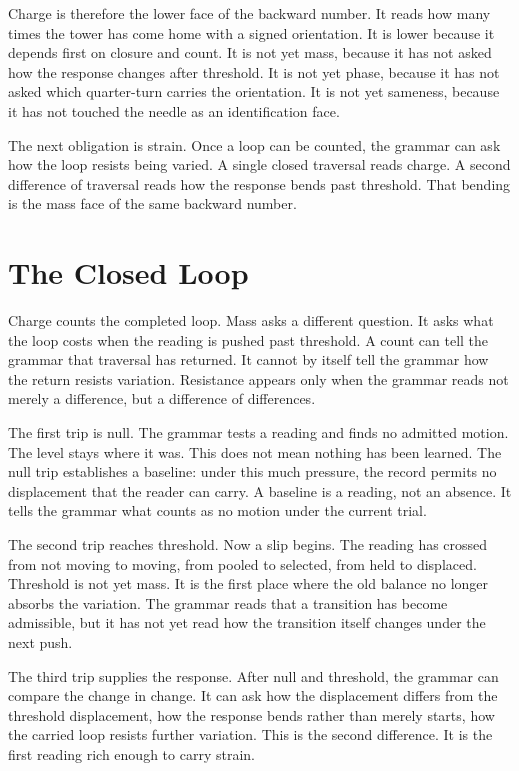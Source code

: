 Charge is therefore the lower face of the backward number. It reads how many
times the tower has come home with a signed orientation. It is lower because
it depends first on closure and count. It is not yet mass, because it has not
asked how the response changes after threshold. It is not yet phase, because
it has not asked which quarter-turn carries the orientation. It is not yet
sameness, because it has not touched the needle as an identification face.

The next obligation is strain. Once a loop can be counted, the grammar can
ask how the loop resists being varied. A single closed traversal reads
charge. A second difference of traversal reads how the response bends past
threshold. That bending is the mass face of the same backward number.

\section{The Closed Loop}

Charge counts the completed loop. Mass asks a different question. It asks
what the loop costs when the reading is pushed past threshold. A count can
tell the grammar that traversal has returned. It cannot by itself tell the
grammar how the return resists variation. Resistance appears only when the
grammar reads not merely a difference, but a difference of differences.

The first trip is null. The grammar tests a reading and finds no admitted
motion. The level stays where it was. This does not mean nothing has been
learned. The null trip establishes a baseline: under this much pressure, the
record permits no displacement that the reader can carry. A baseline is a
reading, not an absence. It tells the grammar what counts as no motion under
the current trial.

The second trip reaches threshold. Now a slip begins. The reading has crossed
from not moving to moving, from pooled to selected, from held to displaced.
Threshold is not yet mass. It is the first place where the old balance no
longer absorbs the variation. The grammar reads that a transition has become
admissible, but it has not yet read how the transition itself changes under
the next push.

The third trip supplies the response. After null and threshold, the grammar
can compare the change in change. It can ask how the displacement differs
from the threshold displacement, how the response bends rather than merely
starts, how the carried loop resists further variation. This is the second
difference. It is the first reading rich enough to carry strain.

